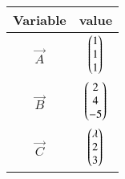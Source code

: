 \begin{tabular}[12pt]{ |c| c|}
    \hline
    \textbf{Variable} & \textbf{value}\\ 
    \hline
    $\vec{A}$ & $\begin{pmatrix}1\\1\\1\end{pmatrix}$\\
    \hline
    $\vec{B}$ & $\begin{pmatrix}2\\4\\-5\end{pmatrix}$\\
    \hline
    $\vec{C}$ & $\begin{pmatrix} \lambda\\2\\3\end{pmatrix}$\\
    \hline
    \end{tabular}